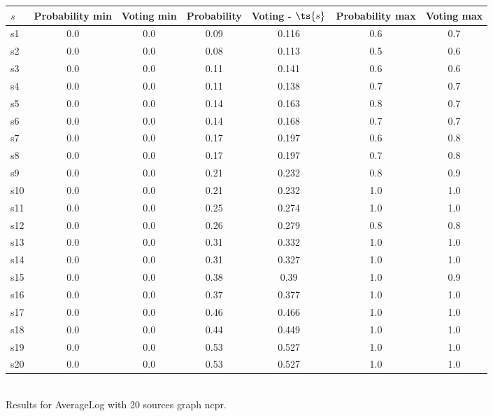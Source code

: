 \documentclass{article}
\begin{document}
\noindent\begin{tabular}{|l|c|c|c|c|c|c|}
\hline
$s$& Probability min & Voting min & Probability & Voting - $\ts{s}$ & Probability max & Voting max\\
\hline
s1 &0.0 & 0.0 & 0.09 & 0.116 & 0.6 & 0.7\\
\hline
s2 &0.0 & 0.0 & 0.08 & 0.113 & 0.5 & 0.6\\
\hline
s3 &0.0 & 0.0 & 0.11 & 0.141 & 0.6 & 0.6\\
\hline
s4 &0.0 & 0.0 & 0.11 & 0.138 & 0.7 & 0.7\\
\hline
s5 &0.0 & 0.0 & 0.14 & 0.163 & 0.8 & 0.7\\
\hline
s6 &0.0 & 0.0 & 0.14 & 0.168 & 0.7 & 0.7\\
\hline
s7 &0.0 & 0.0 & 0.17 & 0.197 & 0.6 & 0.8\\
\hline
s8 &0.0 & 0.0 & 0.17 & 0.197 & 0.7 & 0.8\\
\hline
s9 &0.0 & 0.0 & 0.21 & 0.232 & 0.8 & 0.9\\
\hline
s10 &0.0 & 0.0 & 0.21 & 0.232 & 1.0 & 1.0\\
\hline
s11 &0.0 & 0.0 & 0.25 & 0.274 & 1.0 & 1.0\\
\hline
s12 &0.0 & 0.0 & 0.26 & 0.279 & 0.8 & 0.8\\
\hline
s13 &0.0 & 0.0 & 0.31 & 0.332 & 1.0 & 1.0\\
\hline
s14 &0.0 & 0.0 & 0.31 & 0.327 & 1.0 & 1.0\\
\hline
s15 &0.0 & 0.0 & 0.38 & 0.39 & 1.0 & 0.9\\
\hline
s16 &0.0 & 0.0 & 0.37 & 0.377 & 1.0 & 1.0\\
\hline
s17 &0.0 & 0.0 & 0.46 & 0.466 & 1.0 & 1.0\\
\hline
s18 &0.0 & 0.0 & 0.44 & 0.449 & 1.0 & 1.0\\
\hline
s19 &0.0 & 0.0 & 0.53 & 0.527 & 1.0 & 1.0\\
\hline
s20 &0.0 & 0.0 & 0.53 & 0.527 & 1.0 & 1.0\\
\hline
\end{tabular}\\

\noindent Results for AverageLog with 20 sources graph ncpr.
\end{document}
